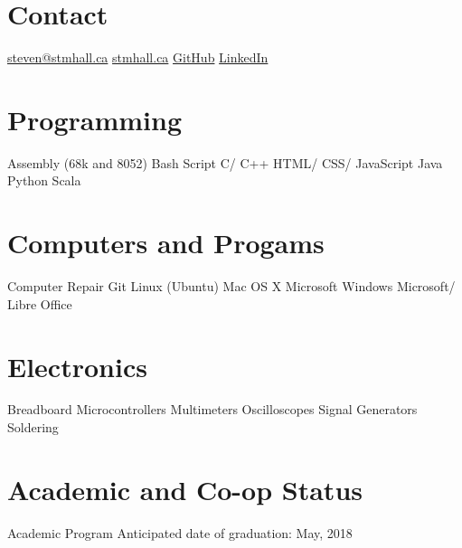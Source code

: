 \documentclass[]{friggeri-cv} %
\begin{document}


\begin{aside} %
\section{Contact}
\href{mailto:steven@stmhall.ca}{steven@stmhall.ca}
\href{http://stmhall.ca}{stmhall.ca}
\href{http://github.com/hallzy}{GitHub}
\href{https://www.linkedin.com/in/steventmhall}{LinkedIn}
\section{Programming}
Assembly (68k and 8052)
Bash Script
C/ C++
HTML/ CSS/ JavaScript
Java
Python
Scala
\section{Computers and Progams}
Computer Repair
Git
Linux (Ubuntu)
Mac OS X
Microsoft Windows
Microsoft/ Libre Office
\section{Electronics}
Breadboard
Microcontrollers
Multimeters
Oscilloscopes
Signal Generators
Soldering
\end{aside}

\section{Academic and Co-op Status}

\begin{entrylist}

\entry
{}
{Academic Program}
{}
{
Anticipated date of graduation: May, 2018
}
\end{entrylist}

\end{document}
